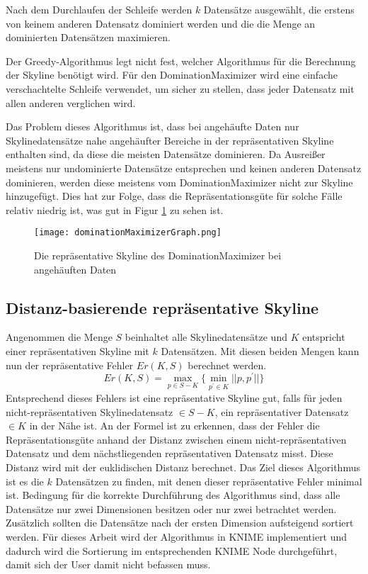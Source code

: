 Nach dem Durchlaufen der Schleife werden $k$ Datensätze ausgewählt, die erstens von keinem anderen Datensatz dominiert werden und die die Menge an dominierten Datensätzen maximieren.

Der Greedy-Algorithmus legt nicht fest, welcher Algorithmus für die Berechnung der Skyline benötigt wird. Für den DominationMaximizer wird eine einfache verschachtelte Schleife verwendet, um sicher zu stellen, dass jeder Datensatz mit allen anderen verglichen wird. 

Das Problem dieses Algorithmus ist, dass bei angehäufte Daten nur Skylinedatensätze nahe angehäufter Bereiche in der repräsentativen Skyline enthalten sind, da diese die meisten Datensätze dominieren. Da Ausreißer meistens nur undominierte Datensätze entsprechen und keinen anderen Datensatz dominieren, werden diese meistens vom DominationMaximizer nicht zur Skyline hinzugefügt.  Dies hat zur Folge, dass die Repräsentationsgüte für solche Fälle relativ niedrig ist, was gut in Figur \ref{img:dominationMaximizerGraph} zu sehen ist.
 
\begin{figure}[H]
	\centering
	\texttt{[image: dominationMaximizerGraph.png]}
	\caption{Die repräsentative Skyline des DominationMaximizer bei angehäuften Daten}
	\label{img:dominationMaximizerGraph}
\end{figure}
\subsection{Distanz-basierende repräsentative Skyline}
\label{ch:Analyse:sec:repSkyAlgos:subsec:disBasedRepSky}
Angenommen die Menge $S$ beinhaltet alle Skylinedatensätze und $K$ entspricht einer repräsentativen Skyline mit $k$ Datensätzen. Mit diesen beiden Mengen kann nun der repräsentative Fehler $Er(K,S)$ berechnet werden. 
$$Er(K,S)=\max\limits_{p\in{S-K}}\{\min\limits_{p^{'} \in{K}}||p,p^{'}||\}$$
Entsprechend dieses Fehlers ist eine repräsentative Skyline gut, falls für jeden nicht-repräsentativen Skylinedatensatz $\in{S-K}$, ein repräsentativer Datensatz $\in{K}$ in der Nähe ist. An der Formel ist zu erkennen, dass der Fehler die Repräsentationsgüte anhand der Distanz zwischen einem nicht-repräsentativen Datensatz und dem nächstliegenden repräsentativen Datensatz misst. Diese Distanz wird mit der euklidischen Distanz berechnet.
Das Ziel dieses Algorithmus ist es die $k$ Datensätzen zu finden, mit denen dieser repräsentative Fehler minimal ist. Bedingung für die korrekte Durchführung des Algorithmus sind, dass alle Datensätze nur zwei Dimensionen besitzen oder nur zwei betrachtet werden. Zusätzlich sollten die Datensätze nach der ersten Dimension aufsteigend sortiert werden. Für dieses Arbeit wird der Algorithmus in KNIME implementiert und dadurch wird die Sortierung im entsprechenden KNIME Node durchgeführt, damit sich der User damit nicht befassen muss. 

